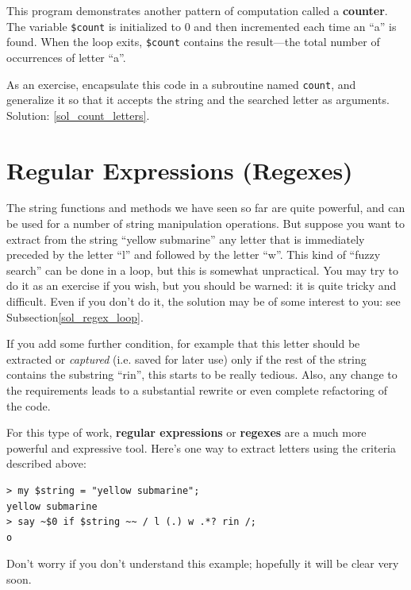 This program demonstrates another pattern of computation called a {\bf
counter}.  The variable \verb'$count' is initialized to 0 and then
incremented each time an ``a'' is found. When the loop exits, 
\verb'$count' contains the result---the total number of 
occurrences of letter ``a''.

As an exercise, encapsulate this code in a subroutine named 
{\tt count}, and generalize it so that it accepts the string
and the searched letter as arguments. Solution: \ref{sol_count_letters}.
\label{count_letters}

\section{Regular Expressions (Regexes)}
\label{regex}

The string functions and methods we have seen so far are 
quite powerful, and can be used for a number of string 
manipulation operations. But suppose you want to extract 
from the string ``yellow submarine'' any letter that is 
immediately preceded by the letter ``l'' and followed by 
the letter ``w''. This kind of ``fuzzy search'' 
can be done in a loop, but this is 
somewhat unpractical. You may try to do it as an exercise if 
you wish, but you should be warned: it is quite tricky and 
difficult. Even if you don't do it, the solution may be of some 
interest to you: see Subsection\ref{sol_regex_loop}. 
\label{regex_loop}


If you add some further condition, 
for example that this letter should be extracted or 
\emph{captured} (i.e. saved for later use) only if 
the rest of the string contains the substring ``rin'', 
this starts to be really tedious. Also, any change to the 
requirements leads to a substantial rewrite or even 
complete refactoring of the code.

For this type of work, {\bf regular expressions} or 
{\bf regexes}  are a much more powerful and expressive tool. 
Here's one way to extract letters using the criteria 
described above:

\begin{verbatim}
> my $string = "yellow submarine";
yellow submarine
> say ~$0 if $string ~~ / l (.) w .*? rin /;
o
\end{verbatim}

Don't worry if you don't understand this example; 
hopefully it will be clear very soon.


